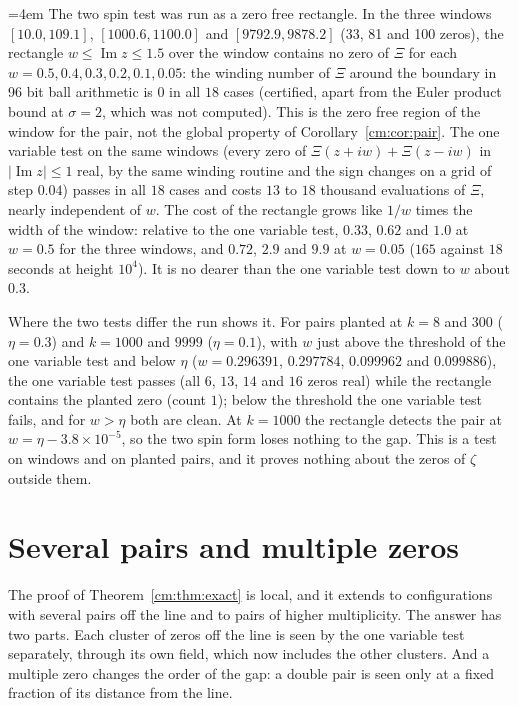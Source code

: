 {\emergencystretch=4em The two spin test was run as a zero free rectangle. In the three windows $[10.0,109.1]$, $[1000.6,1100.0]$ and $[9792.9,9878.2]$ (33, 81 and 100 zeros), the rectangle $w\le\operatorname{Im}z\le1.5$ over the window contains no zero of $\Xi$ for each $w=0.5,0.4,0.3,0.2,0.1,0.05$: the winding number of $\Xi$ around the boundary in 96 bit ball arithmetic is $0$ in all $18$ cases (certified, apart from the Euler product bound at $\sigma=2$, which was not computed). This is the zero free region of the window for the pair, not the global property of Corollary~\ref{cm:cor:pair}. The one variable test on the same windows (every zero of $\Xi(z+iw)+\Xi(z-iw)$ in $|\operatorname{Im}z|\le1$ real, by the same winding routine and the sign changes on a grid of step $0.04$) passes in all $18$ cases and costs $13$ to $18$ thousand evaluations of $\Xi$, nearly independent of $w$. The cost of the rectangle grows like $1/w$ times the width of the window: relative to the one variable test, $0.33$, $0.62$ and $1.0$ at $w=0.5$ for the three windows, and $0.72$, $2.9$ and $9.9$ at $w=0.05$ ($165$ against $18$ seconds at height $10^4$). It is no dearer than the one variable test down to $w$ about $0.3$.\par}

Where the two tests differ the run shows it. For pairs planted at $k=8$ and $300$ ($\eta=0.3$) and $k=1000$ and $9999$ ($\eta=0.1$), with $w$ just above the threshold of the one variable test and below $\eta$ ($w=0.296391$, $0.297784$, $0.099962$ and $0.099886$), the one variable test passes (all $6$, $13$, $14$ and $16$ zeros real) while the rectangle contains the planted zero (count $1$); below the threshold the one variable test fails, and for $w>\eta$ both are clean. At $k=1000$ the rectangle detects the pair at $w=\eta-3.8\times10^{-5}$, so the two spin form loses nothing to the gap. This is a test on windows and on planted pairs, and it proves nothing about the zeros of $\zeta$ outside them.

\section{Several pairs and multiple zeros}\label{cm:sec:several}

The proof of Theorem~\ref{cm:thm:exact} is local, and it extends to configurations with several pairs off the line and to pairs of higher multiplicity. The answer has two parts. Each cluster of zeros off the line is seen by the one variable test separately, through its own field, which now includes the other clusters. And a multiple zero changes the order of the gap: a double pair is seen only at a fixed fraction of its distance from the line.

